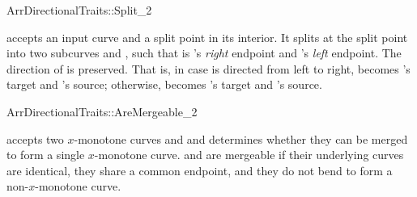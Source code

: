 \ccRefPageBegin
\begin{ccRefConcept}{ArrDirectionalTraits::Split_2}

\ccHasModels{}

\def\ccTagRmConstRefPair{\ccFalse}%
  {accepts an input curve  and a split point  in its
  interior. It splits  at the split point into two subcurves
   and , such that  is 's \emph{right}
  endpoint and 's \emph{left} endpoint. The direction of 
  is preserved. That is, in case  is directed from left to right,
   becomes 's target and 's source;
  otherwise,  becomes 's target and 's source.}%
\ccTagDefaults
\end{ccRefConcept}
\ccRefPageEnd

\ccRefPageBegin
\begin{ccRefConcept}{ArrDirectionalTraits::AreMergeable_2}

\ccHasModels{}

\def\ccTagRmConstRefPair{\ccFalse}%
  {accepts two $x$-monotone curves  and  and determines
  whether they can be merged to form a single $x$-monotone curve.
   and  are mergeable if their underlying curves are
  identical, they share a common endpoint, and they do not bend to form
  a non-$x$-monotone curve.
  }
\end{ccRefConcept}
\ccRefPageEnd

